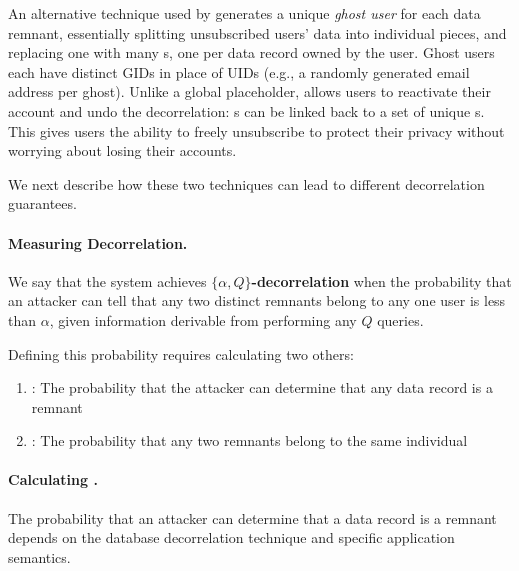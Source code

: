 An alternative technique used by \sys{} generates a unique \emph{ghost user} for each data remnant,
essentially splitting unsubscribed users' data into individual pieces, and replacing one
\uidkey{} with many \gidkey{}s, one per data record owned by the user. Ghost users each have
distinct GIDs in place of UIDs (e.g., a randomly generated email
address per ghost).  Unlike a global placeholder, \sys{} allows users to reactivate their account and
undo the decorrelation: \uidkey{}s can be linked back to a set of unique \gidkey{}s.
This gives users the ability to freely unsubscribe to protect their privacy without worrying about
losing their accounts.   

We next describe how these two techniques can lead to different decorrelation guarantees.

\paragraph{Measuring Decorrelation.} 
We say that the system achieves \textbf{$\{\alpha,Q\}$-decorrelation} when the probability that an attacker
can tell that any two distinct remnants belong to any one user is less than $\alpha$, given
information derivable from performing any $Q$ queries.

Defining this probability requires calculating two others: \begin{enumerate}
    \item[\premnant{}]: 
        The probability that the attacker can determine that any data record is a remnant
    \item[\plinked{}]:
        The probability that any two remnants belong to the same individual
\end{enumerate}


\paragraph{Calculating \premnant{}.}
The probability that an attacker can determine that a data record is a remnant depends on the
database decorrelation technique and specific application semantics.

